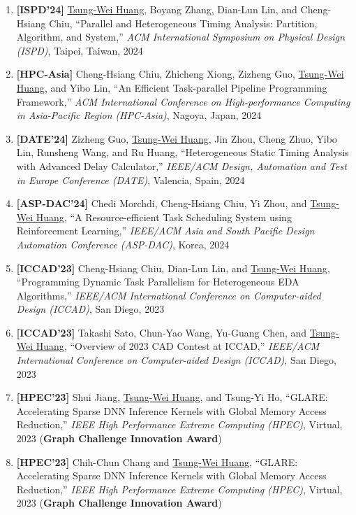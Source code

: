 \documentclass[A4,11pt]{article}
\begin{document}
\begin{enumerate}
    \item \textbf{[ISPD'24]} \underline{Tsung-Wei Huang}, Boyang Zhang, Dian-Lun Lin, and Cheng-Hsiang Chiu, ``Parallel and Heterogeneous Timing Analysis: Partition, Algorithm, and System,'' \textit{ACM International Symposium on Physical Design (ISPD)}, Taipei, Taiwan, 2024

    \item \textbf{[HPC-Asia]} Cheng-Hsiang Chiu, Zhicheng Xiong, Zizheng Guo, \underline{Tsung-Wei Huang}, and Yibo Lin, ``An Efficient Task-parallel Pipeline Programming Framework,'' \textit{ACM International Conference on High-performance Computing in Asia-Pacific Region (HPC-Asia)}, Nagoya, Japan, 2024

    \item \textbf{[DATE'24]} Zizheng Guo, \underline{Tsung-Wei Huang}, Jin Zhou, Cheng Zhuo, Yibo Lin, Runsheng Wang, and Ru Huang, ``Heterogeneous Static Timing Analysis with Advanced Delay Calculator,'' \textit{IEEE/ACM Design, Automation and Test in Europe Conference (DATE)}, Valencia, Spain, 2024

    \item \textbf{[ASP-DAC'24]} Chedi Morchdi, Cheng-Hsiang Chiu, Yi Zhou, and \underline{Tsung-Wei Huang}, ``A Resource-efficient Task Scheduling System using Reinforcement Learning,'' \textit{IEEE/ACM Asia and South Pacific Design Automation Conference (ASP-DAC)}, Korea, 2024
    
    \item \textbf{[ICCAD'23]} Cheng-Hsiang Chiu, Dian-Lun Lin, and \underline{Tsung-Wei Huang}, ``Programming Dynamic Task Parallelism for Heterogeneous EDA Algorithms,'' \textit{IEEE/ACM International Conference on Computer-aided Design (ICCAD)}, San Diego, 2023
    
    \item \textbf{[ICCAD'23]} Takashi Sato, Chun-Yao Wang, Yu-Guang Chen, and \underline{Tsung-Wei Huang}, ``Overview of 2023 CAD Contest at ICCAD,'' \textit{IEEE/ACM International Conference on Computer-aided Design (ICCAD)}, San Diego, 2023
    
    \item \textbf{[HPEC'23]} Shui Jiang, \underline{Tsung-Wei Huang}, and Tsung-Yi Ho, ``GLARE: Accelerating Sparse DNN Inference Kernels with Global Memory Access Reduction,'' \textit{IEEE High Performance Extreme Computing (HPEC)}, Virtual, 2023 (\textbf{Graph Challenge Innovation Award})

    \item \textbf{[HPEC'23]} Chih-Chun Chang and \underline{Tsung-Wei Huang}, ``GLARE: Accelerating Sparse DNN Inference Kernels with Global Memory Access Reduction,'' \textit{IEEE High Performance Extreme Computing (HPEC)}, Virtual, 2023 (\textbf{Graph Challenge Innovation Award})


\end{enumerate}
\end{document}
